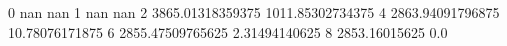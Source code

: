 0 nan nan
1 nan nan
2 3865.01318359375 1011.85302734375
4 2863.94091796875 10.78076171875
6 2855.47509765625 2.31494140625
8 2853.16015625 0.0
